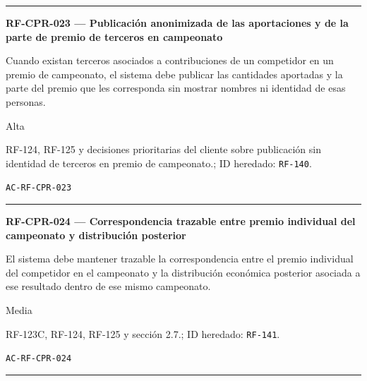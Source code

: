 \documentclass[10pt,letterpaper]{article}
\begin{document}
\vspace{0.25em}\hrule\vspace{0.65em}
\noindent\textbf{RF-CPR-023 --- Publicación anonimizada de las aportaciones y de la parte de premio de terceros en campeonato}\par
\begin{description}[style=nextline,leftmargin=3.15cm,labelwidth=2.8cm,font=\normalfont\bfseries]
\item[Obligación] Cuando existan terceros asociados a contribuciones de un competidor en un premio de campeonato, el sistema debe publicar las cantidades aportadas y la parte del premio que les corresponda sin mostrar nombres ni identidad de esas personas.
\item[Prioridad] Alta
\item[Procedencia] RF-124, RF-125 y decisiones prioritarias del cliente sobre publicación sin identidad de terceros en premio de campeonato.; ID heredado: \texttt{RF-140}.
\item[Verificación] \texttt{AC-RF-CPR-023}
\end{description}
\vspace{0.25em}\hrule\vspace{0.65em}
\noindent\textbf{RF-CPR-024 --- Correspondencia trazable entre premio individual del campeonato y distribución posterior}\par
\begin{description}[style=nextline,leftmargin=3.15cm,labelwidth=2.8cm,font=\normalfont\bfseries]
\item[Obligación] El sistema debe mantener trazable la correspondencia entre el premio individual del competidor en el campeonato y la distribución económica posterior asociada a ese resultado dentro de ese mismo campeonato.
\item[Prioridad] Media
\item[Procedencia] RF-123C, RF-124, RF-125 y sección 2.7.; ID heredado: \texttt{RF-141}.
\item[Verificación] \texttt{AC-RF-CPR-024}
\end{description}
\vspace{0.25em}\hrule\vspace{0.65em}
\end{document}
